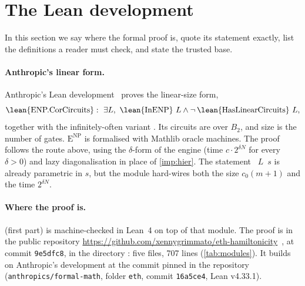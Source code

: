 \documentclass[10pt]{amsart}
\theoremstyle{plain}
\theoremstyle{definition}
\theoremstyle{remark}
\numberwithin{equation}{section}
\newcommand{\ENP}{\mathrm{E}^{\mathrm{NP}}}
\begin{document}
\section{The Lean development}\label{sec:formal}

In this section we say where the formal proof is, quote its statement exactly, list the definitions
a reader must check, and state the trusted base.

\paragraph{Anthropic's linear form.} Anthropic's Lean development~\cite{Anthropic26} proves the
linear-size form,
\[
  \text{\lean{ENP.CorCircuits}}:\ \exists L,\ \text{\lean{InENP}}\ L\wedge\neg\,\text{\lean{HasLinearCircuits}}\ L,
\]
together with the infinitely-often variant . Its circuits are over $B_2$, and
size is the number of gates. $\ENP$ is formalised with Mathlib  oracle machines.
The proof follows the route above, using the $\delta$-form of the engine (time $c\cdot2^{\delta N}$
for every $\delta>0$) and lazy diagonalisation in place of \cref{imp:hier}. The statement
~$L$~$s$ is already parametric in $s$, but the module hard-wires both the size
$c_0(m+1)$ and the time $2^{\delta N}$.

\paragraph{Where the proof is.}  (first part) is machine-checked in Lean~4 on top of
that module. The proof is in the public repository
\url{https://github.com/xennygrimmato/eth-hamiltonicity}~\cite{TulsyanRepo26}, at commit
\texttt{9e5dfc8}, in the directory : five
files, 707 lines (\cref{tab:modules}). It builds on Anthropic's development at the commit pinned in
the repository (\texttt{anthropics/formal-math}, folder \texttt{eth}, commit \texttt{16a5ce4}, Lean
v4.33.1).
\end{document}
